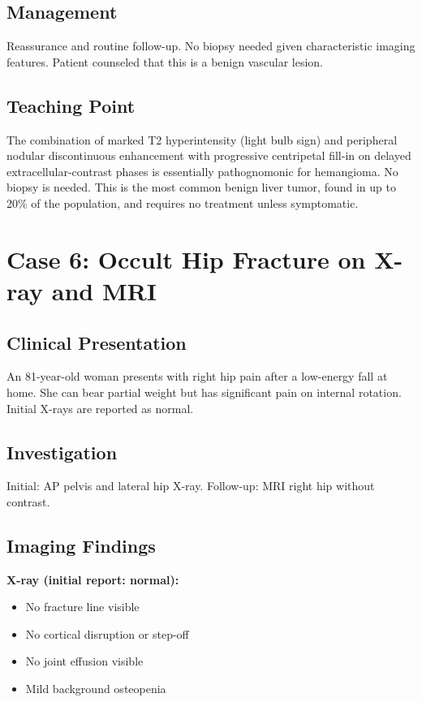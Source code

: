 \subsection{Management}
Reassurance and routine follow-up. No biopsy needed given characteristic imaging features. Patient counseled that this is a benign vascular lesion.

\subsection{Teaching Point}
The combination of marked T2 hyperintensity (light bulb sign) and peripheral nodular discontinuous enhancement with progressive centripetal fill-in on delayed extracellular-contrast phases is essentially pathognomonic for hemangioma. No biopsy is needed. This is the most common benign liver tumor, found in up to 20\% of the population, and requires no treatment unless symptomatic.

\clearpage

\section{Case 6: Occult Hip Fracture on X-ray and MRI}

\subsection{Clinical Presentation}
An 81-year-old woman presents with right hip pain after a low-energy fall at home. She can bear partial weight but has significant pain on internal rotation. Initial X-rays are reported as normal.

\subsection{Investigation}
Initial: AP pelvis and lateral hip X-ray. Follow-up: MRI right hip without contrast.

\subsection{Imaging Findings}
\textbf{X-ray (initial report: normal):}
\begin{itemize}
    \item No fracture line visible
    \item No cortical disruption or step-off
    \item No joint effusion visible
    \item Mild background osteopenia
\end{itemize}


